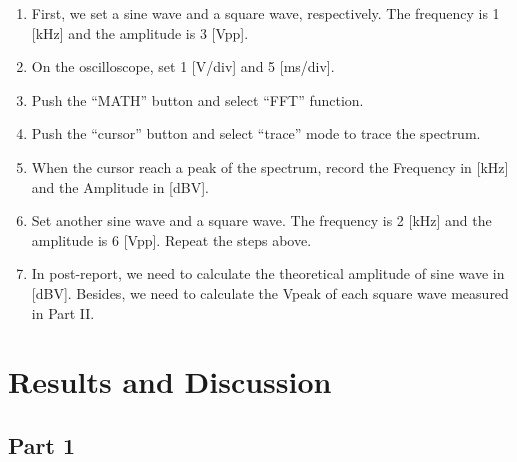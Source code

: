 \documentclass{article}
\begin{document}
\begin{enumerate}

\item

First, we set a sine wave and a square wave, respectively. The frequency is 1 [kHz] and the amplitude is 3 [Vpp].

\item

On the oscilloscope, set 1 [V/div] and 5 [ms/div].

\item

Push the “MATH” button and select “FFT” function.

\item

Push the “cursor” button and select “trace” mode to trace the spectrum.

\item

When the cursor reach a peak of the spectrum, record the Frequency in [kHz] and the Amplitude in [dBV].

\item

Set another sine wave and a square wave. The frequency is 2 [kHz] and the amplitude is 6 [Vpp]. Repeat the steps above.

\item

In post-report, we need to calculate the theoretical amplitude of sine wave in [dBV]. Besides, we need to calculate the Vpeak of each square wave measured in Part II. 
\end{enumerate}

\section{Results and Discussion}

\subsection{Part 1}
\end{document}
